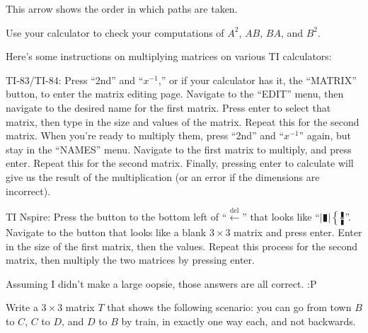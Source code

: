 \documentclass[../gatm_answers.tex]{subfiles}
\begin{document}

This arrow shows the order in which paths are taken.

\begin{inner_problem}
\item Use your calculator to check your computations of $A^2$, $AB$, $BA$, and $B^2$.
\end{inner_problem}

Here's some instructions on multiplying matrices on various TI calculators:

TI-83/TI-84: Press ``2nd'' and ``$x^{-1}$,'' or if your calculator has it, the ``MATRIX'' button, to enter the matrix editing page. Navigate to the ``EDIT'' menu, then navigate to the desired name for the first matrix. Press enter to select that matrix, then type in the size and values of the matrix. Repeat this for the second matrix. When you're ready to multiply them, press ``2nd'' and ``$x^{-1}$'' again, but stay in the ``NAMES'' menu. Navigate to the first matrix to multiply, and press enter. Repeat this for the second matrix. Finally, pressing enter to calculate will give us the result of the multiplication (or an error if the dimensions are incorrect).

TI Nspire: Press the button to the bottom left of ``$\stackrel{\text{del}}{\leftarrow}$'' that looks like ``$|\vrectangleblack|\left\{\frac{\vrectangleblack}{\vrectangleblack}\right.$''. Navigate to the button that looks like a blank $3\times 3$ matrix and press enter. Enter in the size of the first matrix, then the values. Repeat this process for the second matrix, then multiply the two matrices by pressing enter.

Assuming I didn't make a large oopsie, those answers are all correct. :P

\begin{outer_problem}
\item Write a $3\times 3$ matrix $T$ that shows the following scenario: you can go from town $B$ to $C$, $C$ to $D$, and $D$ to $B$ by train, in exactly one way each, and not backwards.
\end{outer_problem}
\end{document}
